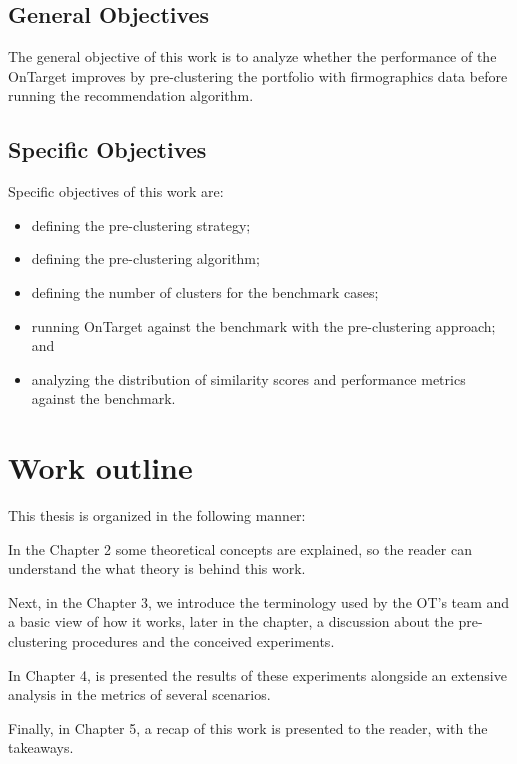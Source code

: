 \subsection{General Objectives}

The general objective of this work is to analyze whether the performance of the OnTarget improves by pre-clustering the portfolio with firmographics data before running the recommendation algorithm.

\subsection{Specific Objectives}

Specific objectives of this work are:

\begin{itemize}
    \item defining the pre-clustering strategy;
	\item defining the pre-clustering algorithm;
    \item defining the number of clusters for the benchmark cases;
    \item running OnTarget against the benchmark with the pre-clustering approach; and
    \item analyzing the distribution of similarity scores and performance metrics against the benchmark.
\end{itemize}


\section{Work outline}

This thesis is organized in the following manner: 

In the Chapter 2 some theoretical concepts are explained, so the reader can understand the what theory is behind this work. 

Next, in the Chapter 3, we introduce the terminology used by the OT's team and a basic view of how it works, later in the chapter, a discussion about the pre-clustering procedures and the conceived experiments.

In Chapter 4, is presented the results of these experiments alongside an extensive analysis in the metrics of several scenarios. 
 
Finally, in Chapter 5, a recap of this work is presented to the reader, with the takeaways. 